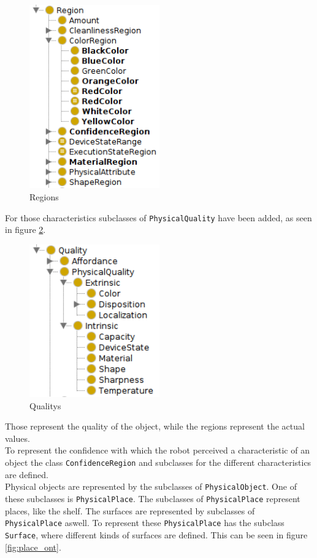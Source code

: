 \documentclass[main.tex]{subfiles}
\begin{document}
\begin{figure}
\centering
\includegraphics[width=0.5\textwidth]{pictures/ontology/Ontologie_region}
\caption{Regions}
\label{fig:region_ont}
\end{figure}

For those characteristics subclasses of \texttt{PhysicalQuality} have been added, as seen in figure \ref{fig:quality_ont}.

\begin{figure}
\centering
\includegraphics[width=0.5\textwidth]{pictures/ontology/Ontologie_quality}
\caption{Qualitys}
\label{fig:quality_ont}
\end{figure}

 Those represent the quality of the object, while the regions represent the actual values.\\
To represent the confidence with which the robot perceived a characteristic of an object the class \texttt{ConfidenceRegion} and subclasses for the different characteristics are defined.\\
Physical objects are represented by the subclasses of \texttt{PhysicalObject}.
One of these subclasses is \texttt{PhysicalPlace}. The subclasses of \texttt{PhysicalPlace} represent places, like the shelf. The surfaces are represented by subclasses of \texttt{PhysicalPlace} aswell. To represent these \texttt{PhysicalPlace} has the subclass \texttt{Surface}, where different kinds of surfaces are defined. This can be seen in figure \ref{fig:place_ont}.
\end{document}
